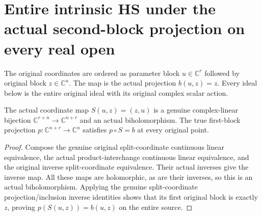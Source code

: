 \section{Entire intrinsic HS under the actual second-block projection on every real open}

The original coordinates are ordered as parameter block $u\in\mathbb C^r$
followed by original block $z\in\mathbb C^n$. The map is the actual
projection $b(u,z)=z$. Every ideal below is the entire original ideal with
its original complex scalar action.

\begin{lemma}
\label{hir:actual-holomorphic-block-swap-projection-dictionary}
\leanok
The actual coordinate map $S(u,z)=(z,u)$ is a genuine complex-linear
bijection $\mathbb C^{r+n}\to\mathbb C^{n+r}$ and an actual biholomorphism.
The true first-block projection $p:\mathbb C^{n+r}\to\mathbb C^n$ satisfies
$p\circ S=b$ at every original point.
\end{lemma}
\begin{proof}
Compose the genuine original split-coordinate continuous linear equivalence,
the actual product-interchange continuous linear equivalence, and the
original inverse split-coordinate equivalence. Their actual inverses give
the inverse map. All these maps are holomorphic, as are their inverses,
so this is an actual biholomorphism. Applying the genuine split-coordinate
projection/inclusion inverse identities shows that its first original
block is exactly $z$, proving $p(S(u,z))=b(u,z)$ on the entire source.
\end{proof}

